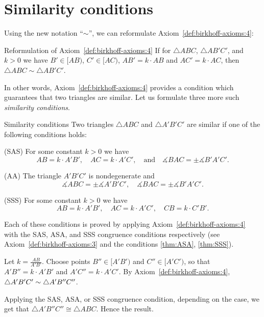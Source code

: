 \section{Similarity conditions}

Using the new notation ``$\sim$'', we can reformulate Axiom~\ref{def:birkhoff-axioms:4}:

\begin{thm}{Reformulation of Axiom~\ref{def:birkhoff-axioms:4}}
If for  
$\triangle ABC$, 
$\triangle AB'C'$,
and $k>0$ we have
$B'\in [AB)$,
$C'\in [AC)$,
$AB'=k\cdot AB$ and
$AC'=k\cdot AC$,
then $\triangle ABC\sim\triangle AB'C'$.
\end{thm}

In other words, Axiom~\ref{def:birkhoff-axioms:4} provides 
a condition which guarantees that two triangles are similar.
Let us formulate three more such {}\emph{similarity conditions}.

\begin{thm}{Similarity conditions}\label{prop:sim}
Two triangles 
$\triangle ABC$ and $\triangle A'B'C'$
are similar if one of the following conditions holds:

(SAS)
For some constant $k>0$ we have
\[A B=k\cdot A' B',
\quad 
A C=k\cdot A' C',
\quad
\text{and}
\quad 
\measuredangle B A C=\pm\measuredangle B' A' C'.\]

(AA) The triangle $A' B' C'$ is nondegenerate
and 
$$\measuredangle A B C
=
\pm\measuredangle A' B' C',
\quad 
\measuredangle B A C
=
\pm\measuredangle B' A' C'.$$

(SSS) For some constant $k>0$ we have
$$A B=k\cdot A' B',
\quad
A C=k\cdot A' C',
\quad
CB=k\cdot C'B'.$$

\end{thm}

Each of these conditions is proved by applying Axiom~\ref{def:birkhoff-axioms:4} with the SAS, ASA, and SSS congruence conditions respectively
(see Axiom~\ref{def:birkhoff-axioms:3} and the conditions \ref{thm:ASA}, \ref{thm:SSS}).


Let $k=\tfrac{AB}{A'B'}$.
Choose points $B''\in [A'B')$ and $C''\in [A'C')$,
so that $A'B''=k\cdot A'B'$ and $A'C''=k\cdot A'C'$.
By Axiom~\ref{def:birkhoff-axioms:4},
$\triangle A'B'C'\sim \triangle A'B''C''$.

Applying the SAS, ASA, or SSS congruence condition, depending on the case, 
we get that $\triangle A'B''C''\cong \triangle ABC$.
Hence the result.
\qeds

